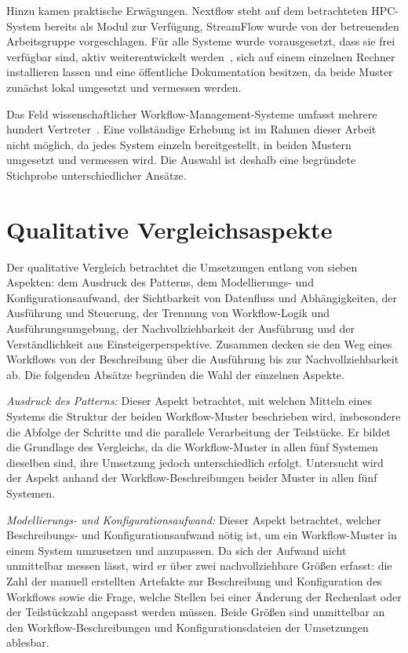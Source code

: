 Hinzu kamen praktische Erwägungen. Nextflow steht auf dem
betrachteten HPC-System bereits als Modul zur Verfügung, StreamFlow
wurde von der betreuenden Arbeitsgruppe vorgeschlagen.
Für alle Systeme wurde vorausgesetzt, dass sie frei verfügbar sind, aktiv
weiterentwickelt werden~\cite{wcisystems}, sich auf einem einzelnen
Rechner installieren lassen und eine öffentliche Dokumentation
besitzen, da beide Muster zunächst lokal umgesetzt und vermessen
werden.

Das Feld wissenschaftlicher Workflow-Management-Systeme umfasst
mehrere hundert Vertreter~\cite{suter2026terminology,wcisystems}.
Eine vollständige Erhebung ist im Rahmen dieser Arbeit nicht
möglich, da jedes System einzeln bereitgestellt, in beiden Mustern
umgesetzt und vermessen wird. Die Auswahl ist deshalb eine
begründete Stichprobe unterschiedlicher Ansätze.

\section{Qualitative Vergleichsaspekte}
\label{sec:methodik:qualitativ}
Der qualitative Vergleich betrachtet die Umsetzungen entlang von
sieben Aspekten: dem Ausdruck des Patterns, dem Modellierungs- und
Konfigurationsaufwand, der Sichtbarkeit von Datenfluss und Abhängigkeiten, der
Ausführung und Steuerung, der Trennung von Workflow-Logik und
Ausführungsumgebung, der Nachvollziehbarkeit der Ausführung 
und der Verständlichkeit aus Einsteigerperspektive. Zusammen decken sie den
Weg eines Workflows von der Beschreibung über die Ausführung bis
zur Nachvollziehbarkeit ab. Die folgenden Absätze
begründen die Wahl der einzelnen Aspekte.

\emph{Ausdruck des Patterns:} Dieser Aspekt betrachtet, mit welchen Mitteln eines Systems die Struktur der beiden Workflow-Muster beschrieben wird, insbesondere die Abfolge der Schritte und die parallele Verarbeitung der Teilstücke. Er bildet die Grundlage des Vergleichs, da die Workflow-Muster in allen fünf Systemen dieselben sind, ihre Umsetzung jedoch unterschiedlich erfolgt. Untersucht wird der Aspekt anhand der Workflow-Beschreibungen beider Muster in allen fünf Systemen.

\emph{Modellierungs- und Konfigurationsaufwand:} Dieser Aspekt betrachtet, welcher Beschreibungs- und Konfigurationsaufwand nötig ist, um ein Workflow-Muster in einem System umzusetzen und anzupassen. Da sich der Aufwand nicht unmittelbar messen lässt, wird er über zwei nachvollziehbare Größen erfasst: die Zahl der manuell erstellten Artefakte zur Beschreibung und Konfiguration des
Workflows sowie die Frage, welche Stellen bei einer Änderung der Rechenlast oder der Teilstückzahl angepasst werden müssen. Beide Größen sind unmittelbar an den Workflow-Beschreibungen und Konfigurationsdateien der Umsetzungen ablesbar.

